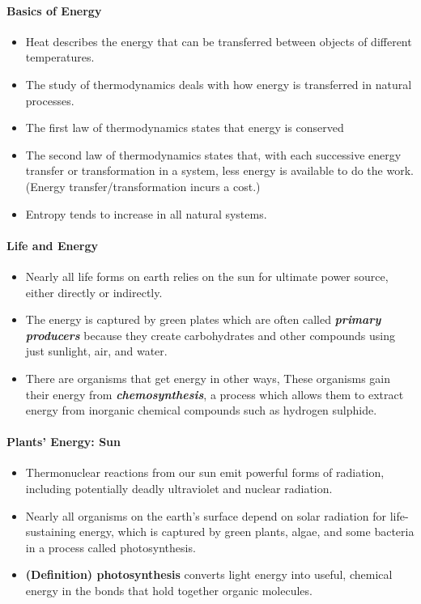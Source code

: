 \documentclass[10pt]{article}
\begin{document}
\paragraph{Basics of Energy}
\begin{itemize}
    \item Heat describes the energy that can be transferred between objects of different temperatures. 
    \item The study of thermodynamics deals with how energy is transferred in natural processes.
    \item The first law of thermodynamics states that energy is conserved
    \item The second law of thermodynamics states that, with each successive energy transfer or transformation in a system, less energy is available to do the work. (Energy transfer/transformation incurs a cost.)
    \item Entropy tends to increase in all natural systems. 
\end{itemize}

\paragraph{Life and Energy}
\begin{itemize}
    \item Nearly all life forms on earth relies on the sun for ultimate power source, either directly or indirectly.
    \item The energy is captured by green plates which are often called \textit{\textbf{primary producers}} because they create carbohydrates and other compounds using just sunlight, air, and water. 
    \item There are organisms that get energy in other ways, These organisms gain their energy from \textit{\textbf{chemosynthesis}}, a process which allows them to extract energy from inorganic chemical compounds such as hydrogen sulphide. 
\end{itemize}

\paragraph{Plants' Energy: Sun}
\begin{itemize}
    \item Thermonuclear reactions from our sun emit powerful forms of radiation, including potentially deadly ultraviolet and nuclear radiation. 
    \item Nearly all organisms on the earth's surface depend on solar radiation for life-sustaining energy, which is captured by green plants, algae, and some bacteria in a process called photosynthesis. 
    \item \textbf{(Definition) photosynthesis} converts light energy into useful, chemical energy in the bonds that hold together organic molecules. 
\end{itemize}
\end{document}
